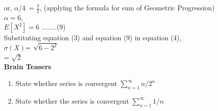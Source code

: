 \documentclass{book}
\begin{document}
or, $\alpha/4\ =\frac{3}{2}$, (applying the formula for sum of Geometric Progression)\\

$\alpha = 6$, \\

$E[X^2]=6$	\hspace{5mm} ........(9)\\

Substituting equation (3) and equation (9) in equation (4), \\

$\sigma(X)$=  $ \sqrt{6- 2 ^ 2} $\\

= $\sqrt{2}$\\

	
\textbf{Brain Teasers}
\begin{enumerate}
\item State whether series is convergent $\sum_{n=1}^{\infty} n/2^{n} $
\item State whether the series is convergent $\sum_{n=1}^{\infty} 1/n$ 
\end{enumerate}





\end{document}
